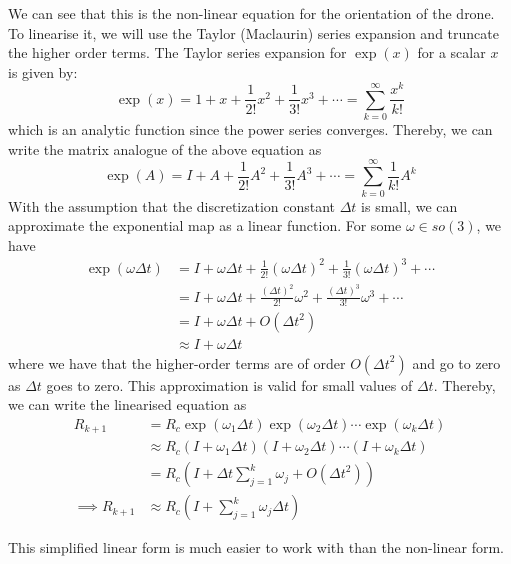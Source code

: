 We can see that this is the non-linear equation for the orientation of the drone.
To linearise it, we will use the Taylor (Maclaurin) series expansion and truncate the higher order terms.
The Taylor series expansion for \( \exp(x) \) for a scalar \( x \) is given by:
\begin{equation*}
    \exp(x)
    =
    1 + x + \frac{1}{2!} x^2 + \frac{1}{3!} x^3 + \cdots
    =
    \sum_{k=0}^{\infty} \frac{x^k}{k!}
\end{equation*}
which is an analytic function since the power series converges.
Thereby, we can write the matrix analogue of the above equation as
\begin{equation*}
    \exp(A)
    =
    I + A + \frac{1}{2!} A^2 + \frac{1}{3!} A^3 + \cdots
    =
    \sum_{k=0}^{\infty} \frac{1}{k!} A^k
\end{equation*}
With the assumption that the discretization constant \( \Delta t \) is small, we can approximate the exponential map as a linear function.
For some \( \omega \in so(3)\), we have
\begin{align*}
    \exp(\omega \Delta t)
     & =
    I + \omega \Delta t + \frac{1}{2!} {(\omega \Delta t)}^2 + \frac{1}{3!} {(\omega \Delta t)}^3 + \cdots
    \\ & =
    I + \omega \Delta t + \frac{{(\Delta t)}^2}{2!} \omega^2 + \frac{{(\Delta t)}^3}{3!} \omega^3 + \cdots
    \\ & =
    I + \omega \Delta t + O({\Delta t}^2)
    \\
     & \approx
    I + \omega \Delta t
\end{align*}
where we have that the higher-order terms are of order \( O({\Delta t}^2) \) and go to zero as \( \Delta t \) goes to zero.
This approximation is valid for small values of \( \Delta t \).
Thereby, we can write the linearised equation as
\begin{align*}
    R_{k+1}
     & =
    R_c \exp(\omega_1 \Delta t) \exp(\omega_2 \Delta t) \cdots \exp(\omega_k \Delta t)
    \\ & \approx
    R_c (I + \omega_1 \Delta t) (I + \omega_2 \Delta t) \cdots (I + \omega_k \Delta t)
    \\ & =
    R_c \left( I + \Delta t \sum_{j=1}^{k} \omega_j + O({\Delta t}^2) \right)
    \\
    \implies
    R_{k+1}
     & \approx
    R_c \left( I + \sum_{j=1}^{k} \omega_j \Delta t \right)
\end{align*}

This simplified linear form is much easier to work with than the non-linear form.
